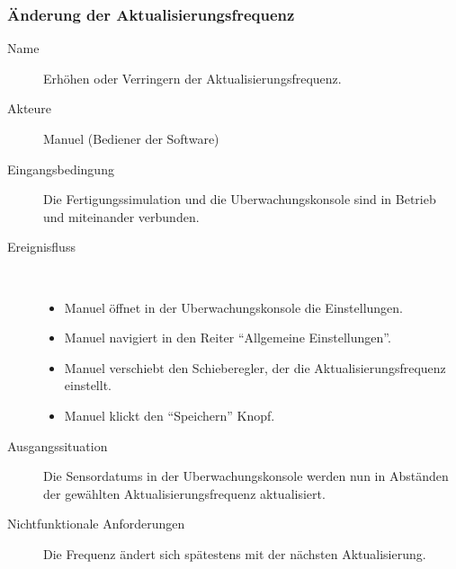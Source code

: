 \documentclass[parskip=full]{scrartcl}
\begin{document}
\subsubsection{Änderung der Aktualisierungsfrequenz}
\begin{description}
 \item[Name] Erhöhen oder Verringern der Aktualisierungsfrequenz.
 \item[Akteure] Manuel (Bediener der Software)
 \item[Eingangsbedingung] Die \gls{Fertigungssimulation} und die \gls{Uberwachungskonsole} sind in Betrieb und miteinander verbunden.
 \item[Ereignisfluss]~\\
 \begin{itemize}[noitemsep]
  \item Manuel öffnet in der \gls{Uberwachungskonsole} die Einstellungen.
  \item Manuel navigiert in den Reiter "`Allgemeine Einstellungen"'.
  \item Manuel verschiebt den Schieberegler, der die Aktualisierungsfrequenz einstellt.
  \item Manuel klickt den "`Speichern"' Knopf.
 \end{itemize}
 \item[Ausgangssituation] Die \glspl{Sensordatum} in der \gls{Uberwachungskonsole} werden nun in Abständen der gewählten Aktualisierungsfrequenz aktualisiert.
 \item [Nichtfunktionale Anforderungen] Die Frequenz ändert sich spätestens mit der nächsten Aktualisierung.
\end{description}
\end{document}
